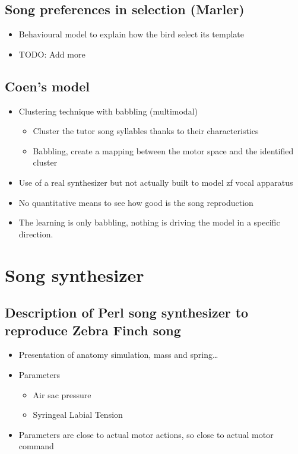 \subsection{Song preferences in selection
(Marler)}\label{song-preferences-in-selection-marler}

\begin{itemize}
\tightlist
\item
  Behavioural model to explain how the bird select its template
\item
  TODO: Add more
\end{itemize}

\subsection{Coen's model}\label{coens-model}

\begin{itemize}
\tightlist
\item
  Clustering technique with babbling (multimodal)

  \begin{itemize}
  \tightlist
  \item
    Cluster the tutor song syllables thanks to their characteristics
  \item
    Babbling, create a mapping between the motor space and the
    identified cluster
  \end{itemize}
\item
  Use of a real synthesizer but not actually built to model zf vocal
  apparatus
\item
  No quantitative means to see how good is the song reproduction
\item
  The learning is only babbling, nothing is driving the model in a
  specific direction.
\end{itemize}

\section{Song synthesizer}\label{song-synthesizer}

\subsection{Description of Perl song synthesizer to reproduce Zebra
Finch
song}\label{description-of-perl-song-synthesizer-to-reproduce-zebra-finch-song}

\begin{itemize}
\tightlist
\item
  Presentation of anatomy simulation, mass and spring\ldots{}
\item
  Parameters

  \begin{itemize}
  \tightlist
  \item
    Air sac pressure
  \item
    Syringeal Labial Tension
  \end{itemize}
\item
  Parameters are close to actual motor actions, so close to actual motor
  command
\end{itemize}

